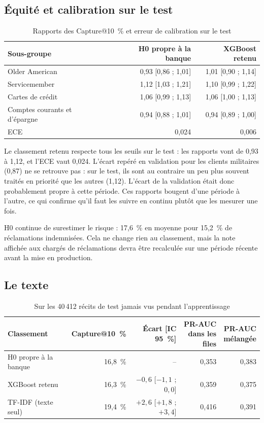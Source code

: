 \documentclass[11pt,a4paper]{article}
\begin{document}
\subsection{Équité et calibration sur le test}

\begin{table}[H]
\centering\small
\begin{tabular}{@{}l r r@{}}
\toprule
Sous-groupe & H0 propre à la banque & XGBoost retenu \\
\midrule
Older American & 0,93 [0,86 ; 1,01] & 1,01 [0,90 ; 1,14] \\
Servicemember & 1,12 [1,03 ; 1,21] & 1,10 [0,99 ; 1,22] \\
Cartes de crédit & 1,06 [0,99 ; 1,13] & 1,06 [1,00 ; 1,13] \\
Comptes courants et d'épargne & 0,94 [0,88 ; 1,01] & 0,94 [0,89 ; 1,00] \\
\midrule
ECE & 0,024 & 0,006 \\
\bottomrule
\end{tabular}
\caption{Rapports des Capture@10~\% et erreur de calibration sur le test}
\end{table}

Le classement retenu respecte tous les seuils sur le test : les rapports vont de 0,93 à 1,12, et l'ECE vaut 0,024. L'écart repéré en validation pour les clients militaires (0,87) ne se retrouve pas : sur le test, ils sont au contraire un peu plus souvent traités en priorité que les autres (1,12). L'écart de la validation était donc probablement propre à cette période. Ces rapports bougent d'une période à l'autre, ce qui confirme qu'il faut les suivre en continu plutôt que les mesurer une fois.

H0 continue de surestimer le risque : 17,6~\% en moyenne pour 15,2~\% de réclamations indemnisées. Cela ne change rien au classement, mais la note affichée aux chargés de réclamations devra être recalculée sur une période récente avant la mise en production.

\subsection{Le texte}

\begin{table}[H]
\centering\small
\begin{tabular}{@{}l r r r r@{}}
\toprule
Classement & Capture@10~\% & Écart [IC 95~\%] & \shortstack[r]{PR-AUC\\dans les files} & \shortstack[r]{PR-AUC\\mélangée} \\
\midrule
H0 propre à la banque & 16,8~\% & -- & 0,353 & 0,383 \\
XGBoost retenu & 16,3~\% & $-0{,}6$ [$-1{,}1$ ; $0{,}0$] & 0,359 & 0,375 \\
TF-IDF (texte seul) & 19,4~\% & $+2{,}6$ [$+1{,}8$ ; $+3{,}4$] & 0,416 & 0,391 \\
\bottomrule
\end{tabular}
\caption{Sur les 40\,412 récits de test jamais vus pendant l'apprentissage}
\end{table}
\end{document}
